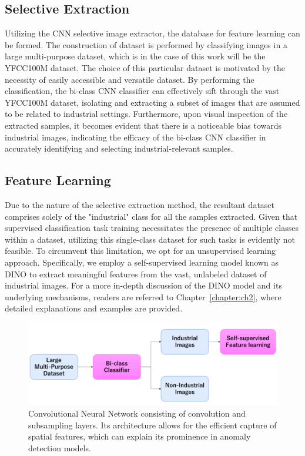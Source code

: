 \subsection{Selective Extraction}
\label{cnn selective extraction}
Utilizing the CNN selective image extractor, the database for feature learning can be formed. The construction of dataset is performed by classifying images in a large multi-purpose dataset, which is in the case of this work will be the YFCC100M dataset. The choice of this particular dataset is motivated by the necessity of easily accessible and versatile dataset. By performing the classification, the bi-class CNN classifier can effectively sift through the vast YFCC100M dataset, isolating and extracting a subset of images that are assumed to be related to industrial settings. Furthermore, upon visual inspection of the extracted samples, it becomes evident that there is a noticeable bias towards industrial images, indicating the efficacy of the bi-class CNN classifier in accurately identifying and selecting industrial-relevant samples.

\subsection{Feature Learning}
\label{feature learning cnn}
Due to the nature of the selective extraction method, the resultant dataset comprises solely of the "industrial" class for all the samples extracted. Given that supervised classification task training necessitates the presence of multiple classes within a dataset, utilizing this single-class dataset for such tasks is evidently not feasible. To circumvent this limitation, we opt for an unsupervised learning approach. Specifically, we employ a self-supervised learning model known as DINO to extract meaningful features from the vast, unlabeled dataset of industrial images. For a more in-depth discussion of the DINO model and its underlying mechanisms, readers are referred to Chapter~\ref{chapter:ch2}, where detailed explanations and examples are provided.

\begin{figure}[h!]
	\begin{center}
		\includegraphics[width=1.0\linewidth]{Chapter_3/cnn_extraction.png}
	\end{center}
	\caption{Convolutional Neural Network consisting of convolution and subsampling layers. Its architecture allows for the efficient capture of spatial features, which can explain its prominence in anomaly detection models.}
	\label{fig:cnn}
\end{figure} 	

